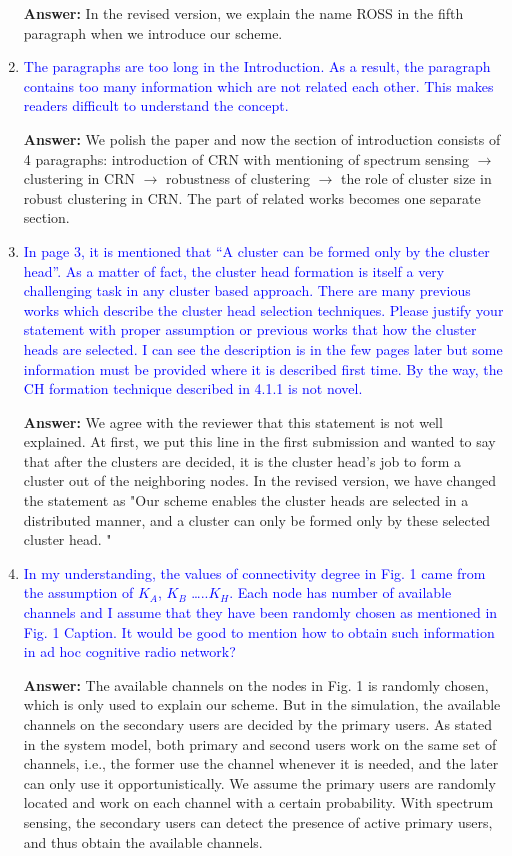 \documentclass[10pt,a4paper]{article}
\begin{document}
\begin{enumerate}
    \textbf{Answer:} In the revised version, we explain the name ROSS in the fifth paragraph when we introduce our scheme.
    
\item \textcolor{blue}{  The paragraphs are too long in the Introduction. As a result, the paragraph contains too many information which are not related each other. This makes readers difficult to understand the concept.}
    
    \textbf{Answer:} We polish the paper and now the section of introduction consists of 4 paragraphs: introduction of CRN with mentioning of spectrum sensing $\rightarrow$ clustering in CRN $\rightarrow$ robustness of clustering $\rightarrow$ the role of cluster size in robust clustering in CRN.
    The part of related works becomes one separate section.
    
\item \textcolor{blue}{   In page 3, it is mentioned that “A cluster can be formed only by the cluster head”. As a matter of fact, the cluster head formation is itself a very challenging task in any cluster based approach. There are many previous works which describe the cluster head selection techniques. Please justify your statement with proper assumption or previous works that how the cluster heads are selected. I can see the description is in the few pages later but some information must be provided where it is described first time. By the way, the CH formation technique described in 4.1.1 is not novel.}

\textbf{Answer:} We agree with the reviewer that this statement is not well explained.
	    At first, we put this line in the first submission and wanted to say that after the clusters are decided, it is the cluster head's job to form a cluster out of the neighboring nodes.
In the revised version, we have changed the statement as "Our scheme enables the cluster heads are selected in a distributed manner, and a cluster can only be formed only by these selected cluster head. "
    
\item \textcolor{blue}{  In my understanding, the values of connectivity degree in Fig. 1 came from the assumption of $K_A$, $K_B$ …..$K_H$. Each node has number of available channels and I assume that they have been randomly chosen as mentioned in Fig. 1 Caption. It would be good to mention how to obtain such information in ad hoc cognitive radio network?}

\textbf{Answer:} 
The available channels on the nodes in Fig. 1 is randomly chosen, which is only used to explain our scheme.
But in the simulation, the available channels on the secondary users are decided by the primary users.
As stated in the system model, both primary and second users work on the same set of channels, i.e., the former use the channel whenever it is needed, and the later can only use it opportunistically.
    We assume the primary users are randomly located and work on each channel with a certain probability.
    With spectrum sensing, the secondary users can detect the presence of active primary users, and thus obtain the available channels.
    

\end{enumerate}
\end{document}
